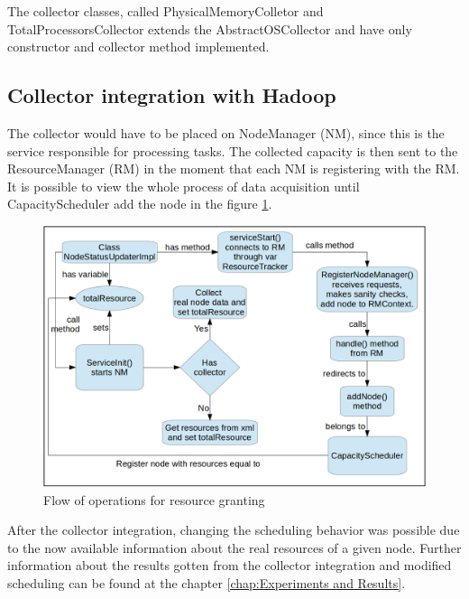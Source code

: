 The collector classes, called PhysicalMemoryColletor and TotalProcessorsCollector extends the AbstractOSCollector and have only constructor and collector method implemented.

\subsection{Collector integration with Hadoop}
The collector would have to be placed on NodeManager (NM), since this is the service responsible for processing tasks. The collected capacity is then sent to the ResourceManager (RM) in the moment that each NM is registering with the RM. It is possible to view the whole process of data acquisition until CapacityScheduler add the node in the figure \ref{fig:collectorflow}.

\begin{figure}[!hbtn]
   \renewcommand{\figurename}{Figure}
   \centering
   \includegraphics[width=15cm]{figuras/Figura20-collectorfig.png}
   \caption{Flow of operations for resource granting}
   \label{fig:collectorflow}
\end{figure}

After the collector integration, changing the scheduling behavior was possible due to the now available information about the real resources of a given node. Further information about the results gotten from the collector integration and modified scheduling can be found at the chapter \ref{chap:Experiments and Results}.